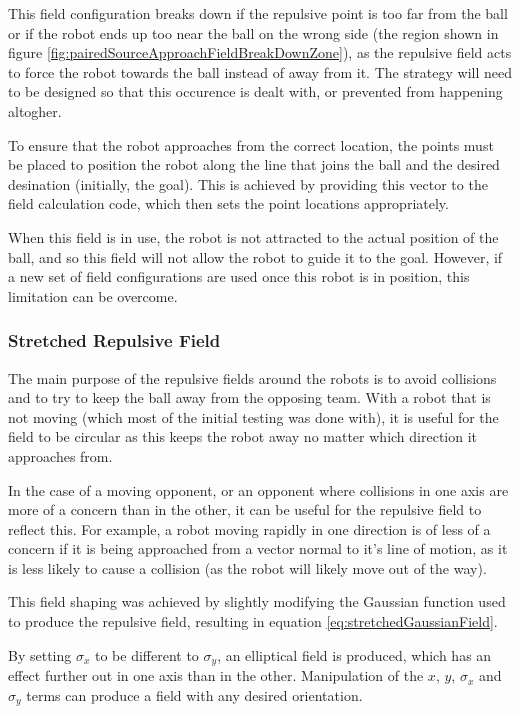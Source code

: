 \documentclass[10pt]{article}
\begin{document}
This field configuration breaks down if the repulsive point is too far from the
ball or if the robot ends up too near the ball on the wrong side (the region
shown in figure \ref{fig:pairedSourceApproachFieldBreakDownZone}), as the
repulsive field acts to force the robot towards the ball instead of away from
it.  The strategy will need to be designed so that this occurence is dealt with,
or prevented from happening altogher.

To ensure that the robot approaches from the correct location, the points must
be placed to position the robot along the line that joins the ball and the
desired desination (initially, the goal).  This is achieved by providing this
vector to the field calculation code, which then sets the point locations
appropriately.

When this field is in use, the robot is not attracted to the actual position of
the ball, and so this field will not allow the robot to guide it to the goal.
However, if a new set of field configurations are used once this robot is in
position, this limitation can be overcome.

\subsubsection{Stretched Repulsive Field}

The main purpose of the repulsive fields around the robots is to avoid
collisions and to try to keep the ball away from the opposing team.  With a
robot that is not moving (which most of the initial testing was done with), it
is useful for the field to be circular as this keeps the robot away no matter
which direction it approaches from.

In the case of a moving opponent, or an opponent where collisions in one axis
are more of a concern than in the other, it can be useful for the repulsive
field to reflect this.  For example, a robot moving rapidly in one direction is
of less of a concern if it is being approached from a vector normal to it's line
of motion, as it is less likely to cause a collision (as the robot will likely
move out of the way).

This field shaping was achieved by slightly modifying the Gaussian function used
to produce the repulsive field, resulting in equation
\ref{eq:stretchedGaussianField}.  

By setting $\sigma_x$ to be different to $\sigma_y$, an elliptical field  is
produced, which has an effect further out in one axis than in the other. 
Manipulation of the $x$, $y$, $\sigma_x$ and $\sigma_y$ terms can produce a
field with any desired orientation.
\end{document}
